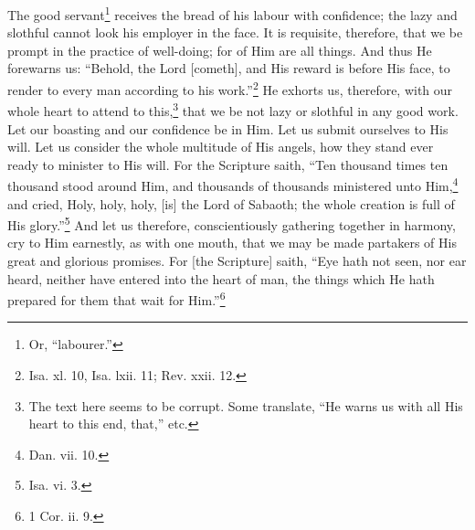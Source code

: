 
The good servant\footnote{Or, “labourer.”} receives the bread of his labour with confidence; the lazy and slothful cannot look his employer in the face. It is requisite, therefore, that we be prompt in the practice of well-doing; for of Him are all things. And thus He forewarns us: “Behold, the Lord [cometh], and His reward is before His face, to render to every man according to his work.”\footnote{Isa. xl. 10, Isa. lxii. 11; Rev. xxii. 12.} He exhorts us, therefore, with our whole heart to attend to this,\footnote{The text here seems to be corrupt. Some translate, “He warns us with all His heart to this end, that,” etc.} that we be not lazy or slothful in any good work. Let our boasting and our confidence be in Him. Let us submit ourselves to His will. Let us consider the whole multitude of His angels, how they stand ever ready to minister to His will. For the Scripture saith, “Ten thousand times ten thousand stood around Him, and thousands of thousands ministered unto Him,\footnote{Dan. vii. 10.} and cried, Holy, holy, holy, [is] the Lord of Sabaoth; the whole creation is full of His glory.”\footnote{Isa. vi. 3.} And let us therefore, conscientiously gathering together in harmony, cry to Him earnestly, as with one mouth, that we may be made partakers of His great and glorious promises. For [the Scripture] saith, “Eye hath not seen, nor ear heard, neither have entered into the heart of man, the things which He hath prepared for them that wait for Him.”\footnote{1 Cor. ii. 9.}


